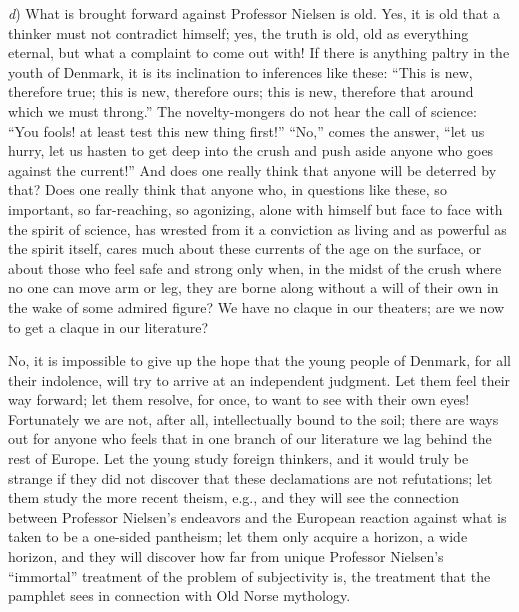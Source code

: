 \documentclass[12pt,a4paper,openany]{book}
\newcommand{\opage}[1]{\marginnote{\footnotesize\textit{[#1]}}}
\begin{document}
\emph{d}) What is brought forward against Professor Nielsen is old. Yes,
it is old that a thinker must not contradict himself; yes, the truth is
old, old as everything eternal, but what a complaint to come out with! If
there is anything paltry in the youth of Denmark, it is its inclination
to inferences like these: ``This is new, therefore true; this is new,
therefore ours; this is new, therefore that around which we must
throng.'' The novelty-mongers do not hear the call of science: ``You
fools! at least test this new thing first!'' ``No,'' comes the answer,
``let us hurry, let us hasten to get deep into the crush and push aside
anyone who goes against the current!'' And does one really think that
anyone will be deterred by that? Does one really think that anyone who,
in questions like these, so important, so far-reaching, so agonizing,
alone with himself but face to face with the spirit of science, has
wrested from it a conviction as living and as powerful as the spirit
itself, cares much about these currents of the age on the
\opage{96}surface, or about those who feel safe and strong only when, in
the midst of the crush where no one can move arm or leg, they are borne
along without a will of their own in the wake of some admired figure? We
have no claque in our theaters; are we now to get a claque in our
literature?

No, it is impossible to give up the hope that the young people of
Denmark, for all their indolence, will try to arrive at an independent
judgment. Let them feel their way forward; let them resolve, for once,
to want to see with their own eyes! Fortunately we are not, after all,
intellectually bound to the soil; there are ways out for anyone who feels
that in one branch of our literature we lag behind the rest of Europe.
Let the young study foreign thinkers, and it would truly be strange if
they did not discover that these declamations are not refutations; let
them study the more recent theism, e.g., and they will see the connection
between Professor Nielsen's endeavors and the European reaction against
what is taken to be a one-sided pantheism; let them only acquire a
horizon, a wide horizon, and they will discover how far from unique
Professor Nielsen's ``immortal'' treatment of the problem of subjectivity
is, the treatment that the pamphlet sees in connection with Old Norse
mythology.
\end{document}
